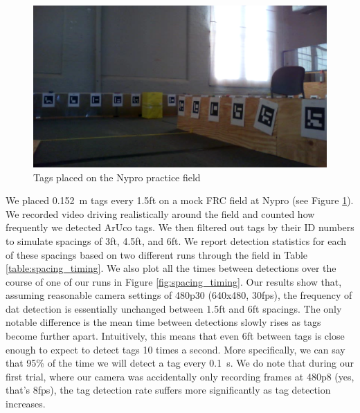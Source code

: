 \documentclass{article}
\begin{document}
    \begin{figure}[H]
      \centering
      \includegraphics[width=1\linewidth]{./images/nypro_tag_spacing.png}
      \caption{Tags placed on the Nypro practice field}
      \label{fig:nypro_tag_spacing}
    \end{figure}

    We placed \SI{0.152}{\meter} tags every 1.5ft on a mock FRC field at Nypro (see Figure \ref{fig:nypro_tag_spacing}). We recorded video driving realistically around the field and counted how frequently we detected ArUco tags. We then filtered out tags by their ID numbers to simulate spacings of 3ft, 4.5ft, and 6ft. We report detection statistics for each of these spacings based on two different runs through the field in Table \ref{table:spacing_timing}. We also plot all the times between detections over the course of one of our runs in Figure \ref{fig:spacing_timing}. Our results show that, assuming reasonable camera settings of 480p30 (640x480, 30fps), the frequency of dat detection is essentially unchanged between 1.5ft and 6ft spacings. The only notable difference is the mean time between detections slowly rises as tags become further apart. Intuitively, this means that even 6ft between tags is close enough to expect to detect tags 10 times a second. More specifically, we can say that 95\% of the time we will detect a tag every \SI{0.1}{\second}. We do note that during our first trial, where our camera was accidentally only recording frames at 480p8 (yes, that's 8fps), the tag detection rate suffers more significantly as tag detection increases.
\end{document}
